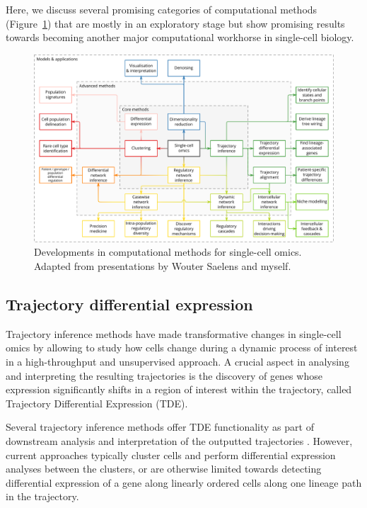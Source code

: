 Here, we discuss several promising categories of computational methods (Figure~\ref{fig:scapplications_extended}) that are mostly in an exploratory stage but show promising results towards becoming another major computational workhorse in single-cell biology.

\begin{figure}[htb!]
	\centering
	\includegraphics[width=\linewidth]{fig/singlecell_technologies_v8.pdf}
	\caption{Developments in computational methods for single-cell omics. Adapted from presentations by Wouter Saelens and myself.}
	\label{fig:scapplications_extended}
\end{figure}


\subsection{Trajectory differential expression}
Trajectory inference methods have made transformative changes in single-cell omics by allowing to study how cells change during a dynamic process of interest in a high-throughput and unsupervised approach. 
A crucial aspect in analysing and interpreting the resulting trajectories is the discovery of genes whose expression significantly shifts in a region of interest within the trajectory, called Trajectory Differential Expression (TDE).

Several trajectory inference methods offer TDE functionality as part of downstream analysis and interpretation of the outputted trajectories \cite{cannoodt_scorpiusimprovestrajectory_2016,qiu_reversedgraphembedding_2017,lonnberg_singlecellrnaseqcomputational_2017,wolf_pagagraphabstraction_2019}. However, current approaches typically cluster cells and perform differential expression analyses between the clusters, or are otherwise limited towards detecting differential expression of a gene along linearly ordered cells along one lineage path in the trajectory.

